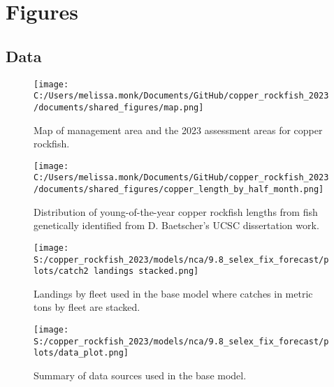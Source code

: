 \documentclass[11pt,
  english,
  letterpaper,
]{article}
\begin{document}
\newpage

\clearpage


\hypertarget{figures}{%
\section{Figures}\label{figures}}

\hypertarget{data-1}{%
\subsection{Data}\label{data-1}}

\begin{figure}
\centering
\texttt{[image: C:/Users/melissa.monk/Documents/GitHub/copper\_rockfish\_2023/documents/shared\_figures/map.png]}
\caption{Map of management area and the 2023 assessment areas for copper rockfish.\label{fig:ca-map}}
\end{figure}

\FloatBarrier

\begin{figure}
\centering
\texttt{[image: C:/Users/melissa.monk/Documents/GitHub/copper\_rockfish\_2023/documents/shared\_figures/copper\_length\_by\_half\_month.png]}
\caption{Distribution of young-of-the-year copper rockfish lengths from fish genetically identified from D. Baetscher's UCSC dissertation work.\label{fig:copper-smurf-length}}
\end{figure}

\pagebreak

\pagebreak

\begin{figure}
\centering
\texttt{[image: S:/copper\_rockfish\_2023/models/nca/9.8\_selex\_fix\_forecast/plots/catch2 landings stacked.png]}
\caption{Landings by fleet used in the base model where catches in metric tons by fleet are stacked.\label{fig:catch}}
\end{figure}

\pagebreak

\begin{figure}
\centering
\texttt{[image: S:/copper\_rockfish\_2023/models/nca/9.8\_selex\_fix\_forecast/plots/data\_plot.png]}
\caption{Summary of data sources used in the base model.\label{fig:data-plot}}
\end{figure}
\end{document}
